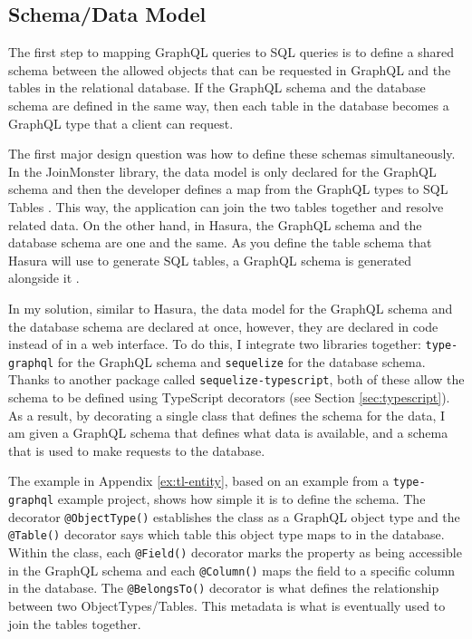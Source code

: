 \subsection{Schema/Data Model}\label{sec:schema}

The first step to mapping GraphQL queries to SQL queries is to define a shared schema between the allowed objects that can be requested in GraphQL and the tables in the relational database.  If the GraphQL schema and the database schema are defined in the same way, then each table in the database becomes a GraphQL type that a client can request.

The first major design question was how to define these schemas simultaneously.  In the JoinMonster library, the data model is only declared for the GraphQL schema and then the developer defines a map from the GraphQL types to SQL Tables \cite{carlJoinMonster}.  This way, the application can join the two tables together and resolve related data.  On the other hand, in Hasura, the GraphQL schema and the database schema are one and the same.  As you define the table schema that Hasura will use to generate SQL tables, a GraphQL schema is generated alongside it \cite{hasurainc.HasuraGraphQLEngine}.

In my solution, similar to Hasura, the data model for the GraphQL schema and the database schema are declared at once, however, they are declared in code instead of in a web interface.  To do this, I integrate two libraries together: \Verb!type-graphql! for the GraphQL schema and \Verb!sequelize! for the database schema.  Thanks to another package called \Verb!sequelize-typescript!, both of these allow the schema to be defined using TypeScript decorators (see Section \ref{sec:typescript}).  As a result, by decorating a single class that defines the schema for the data, I am given a GraphQL schema that defines what data is available, and a schema that is used to make requests to the database.

The example in Appendix \ref{ex:tl-entity}, based on an example from a \Verb!type-graphql! example project, shows how simple it is to define the schema.  The decorator \Verb!@ObjectType()! establishes the class as a GraphQL object type and the \Verb!@Table()! decorator says which table this object type maps to in the database.  Within the class, each \Verb!@Field()! decorator marks the property as being accessible in the GraphQL schema and each \Verb!@Column()! maps the field to a specific column in the database.  The \Verb!@BelongsTo()! decorator is what defines the relationship between two ObjectTypes/Tables.  This metadata is what is eventually used to join the tables together.